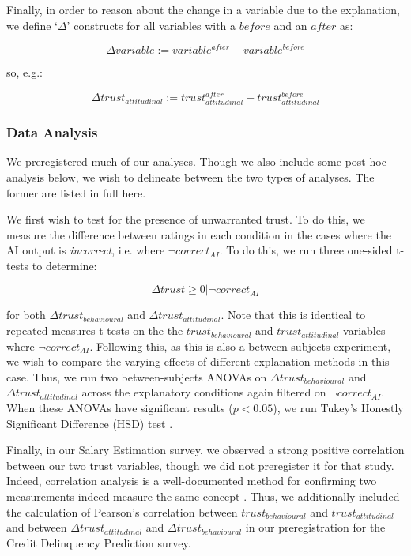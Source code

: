 Finally, in order to reason about the change in a variable due to the explanation, we define `$\Delta$' constructs for all variables with a $before$ and an $after$ as:

\begin{equation}
    \Delta variable := variable^{after} - variable^{before}
\end{equation}

\noindent so, e.g.:

\begin{equation}
    \Delta trust_{attitudinal} := trust_{attitudinal}^{after} - trust_{attitudinal}^{before}
\end{equation}

\subsubsection{Data Analysis}
We preregistered much of our analyses. Though we also include some post-hoc analysis below, we wish to delineate between the two types of analyses. The former are listed in full here.

We first wish to test for the presence of unwarranted trust. To do this, we measure the difference between ratings in each condition in the cases where the AI output is \textit{incorrect}, i.e. where $\neg correct_{AI}$. To do this, we run three one-sided t-tests \cite{Caldwell-et-al} to determine:

\begin{equation}
    \Delta trust \geq 0 | \neg correct_{AI}
\end{equation}

\noindent for both $\Delta trust_{behavioural}$ and $\Delta trust_{attitudinal}$. Note that this is identical to repeated-measures t-tests on the the $trust_{behavioural}$ and $trust_{attitudinal}$ variables where $\neg correct_{AI}$. Following this, as this is also a between-subjects experiment, we wish to compare the varying effects of different explanation methods in this case. Thus, we run two between-subjects ANOVAs \cite{Caldwell-et-al} on $\Delta trust_{behavioural}$ and $\Delta trust_{attitudinal}$ across the explanatory conditions again filtered on $\neg correct_{AI}$. When these ANOVAs have significant results ($p < 0.05$), we run Tukey's Honestly Significant Difference (HSD) test \cite{Caldwell-et-al}.

Finally, in our Salary Estimation survey, we observed a strong positive correlation between our two trust variables, though we did not preregister it for that study. Indeed, correlation analysis is a well-documented method for confirming two measurements indeed measure the same concept \cite{Westen-and-Rosenthal, Morata-Ramírez-and-Holgado-Tello}. Thus, we additionally included the calculation of Pearson's correlation between $trust_{behavioural}$ and $trust_{attitudinal}$ and between $\Delta trust_{attitudinal}$ and $\Delta trust_{behavioural}$ in our preregistration for the Credit Delinquency Prediction survey. 

